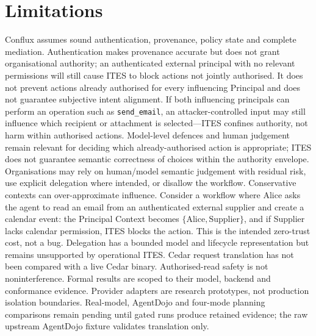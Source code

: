 \documentclass[11pt]{article}
\begin{document}
\section{Limitations}
Conflux assumes sound authentication, provenance, policy state and complete
mediation. Authentication makes provenance accurate but does not grant
organisational authority; an authenticated external principal with no
relevant permissions will still cause ITES to block actions not jointly
authorised. It does not prevent actions already authorised for every influencing
Principal and does not guarantee subjective intent alignment. If both
influencing principals can perform an operation such as
\texttt{send\_email}, an attacker-controlled input may still influence which
recipient or attachment is selected---ITES confines authority, not harm
within authorised actions. Model-level defences and human judgement remain
relevant for deciding which already-authorised action is appropriate; ITES
does not guarantee semantic correctness of choices within the authority
envelope. Organisations may rely on human/model semantic judgement with
residual risk, use explicit delegation where intended, or disallow the
workflow. Conservative
contexts can over-approximate influence. Consider a workflow where Alice asks
the agent to read an email from an authenticated external supplier and create
a calendar event: the Principal Context becomes $\{\text{Alice},
\text{Supplier}\}$, and if Supplier lacks calendar permission, ITES blocks the
action. This is the intended zero-trust cost, not a bug. Delegation has a bounded model and
lifecycle representation but remains unsupported by operational ITES. Cedar
request translation has not been compared with a live Cedar binary.
Authorised-read safety is not noninterference. Formal results are scoped to
their model, backend and conformance evidence. Provider adapters are research
prototypes, not production isolation boundaries. Real-model, AgentDojo and
four-mode planning comparisons remain pending until gated runs produce retained
evidence; the raw upstream AgentDojo fixture validates translation only.
\end{document}
